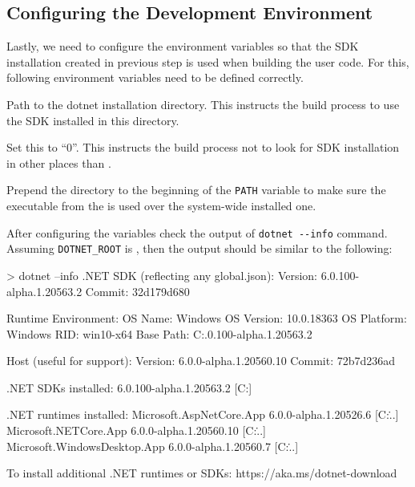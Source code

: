 \subsection{Configuring the Development Environment}\label{sec:06-env-vars}

Lastly, we need to configure the environment variables so that the \dotnet{} SDK installation created in previous step is used when building the user code. For this, following environment variables need to be defined correctly.

\begin{description}

         Path to the dotnet installation directory. This instructs the build process to use the SDK installed in this directory.

         Set this to ``0''. This instructs the build process not to look for SDK installation in other places than .

         Prepend the  directory to the beginning of the \texttt{PATH} variable to make sure the  executable from the  is used over the system-wide installed one.
\end{description}

After configuring the variables check the output of \verb|dotnet --info| command. Assuming
\texttt{DOTNET_ROOT} is , then the output should be similar to the following:

\begin{myVerbatim}
> dotnet --info
.NET SDK (reflecting any global.json):
 Version:   6.0.100-alpha.1.20563.2
 Commit:    32d179d680

Runtime Environment:
 OS Name:     Windows
 OS Version:  10.0.18363
 OS Platform: Windows
 RID:         win10-x64
 Base Path:   C:\dotnet\sdk\6.0.100-alpha.1.20563.2\

Host (useful for support):
  Version: 6.0.0-alpha.1.20560.10
  Commit:  72b7d236ad

.NET SDKs installed:
  6.0.100-alpha.1.20563.2 [C:\dotnet\sdk]

.NET runtimes installed:
  Microsoft.AspNetCore.App 6.0.0-alpha.1.20526.6 [C:\dotnet\shared\...]
  Microsoft.NETCore.App 6.0.0-alpha.1.20560.10 [C:\dotnet\shared\...]
  Microsoft.WindowsDesktop.App 6.0.0-alpha.1.20560.7 [C:\dotnet\shared\...]

To install additional .NET runtimes or SDKs:
  https://aka.ms/dotnet-download
\end{myVerbatim}

